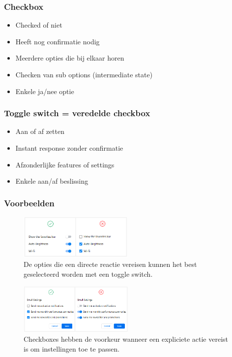 \documentclass{article}
\begin{document}
\subsubsection{Checkbox}
\begin{itemize}
    \item Checked of niet
    \item Heeft nog confirmatie nodig
    \item Meerdere opties die bij elkaar horen
    \item Checken van sub options (intermediate state)
    \item Enkele ja/nee optie
\end{itemize}

\subsubsection{Toggle switch = veredelde checkbox}
\begin{itemize}
    \item Aan of af zetten
    \item Instant response zonder confirmatie
    \item Afzonderlijke features of settings
    \item Enkele aan/af beslissing
\end{itemize}

\subsubsection{Voorbeelden}

\begin{figure}[H]
    \centering
    \includegraphics[width=0.5\textwidth]{toggle-ex-1.png}
    \caption{De opties die een directe reactie vereisen kunnen het best geselecteerd worden met een toggle switch.}
\end{figure}

\begin{figure}[H]
    \centering
    \includegraphics[width=0.5\textwidth]{toggle-ex-2.png}
    \caption{Checkboxes hebben de voorkeur wanneer een expliciete actie vereist is om instellingen toe te passen.}
\end{figure}
\end{document}

